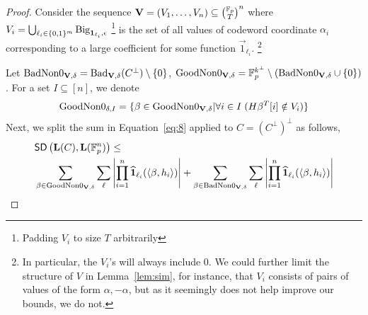 \begin{proof}
Consider the sequence $\vec{V}=(V_1,\ldots,V_n)\subseteq {\binom{\F_p}{T}}^n$ where 
$V_i = \bigcup_{\ell_i\in \{0,1\}^m} \textnormal{Big}_{\mathbf{1}_{\ell_i},\epsilon}$ \footnote{Padding $V_i$ to size $T$ arbitrarily} is the set of all values of codeword coordinate $\alpha_i$ corresponding to a large coefficient for some function $\vec{1}_{\ell_i}$. 
\footnote{In particular, the $V_i$'s will always include 0. We could further limit the structure of $V$ in Lemma~\ref{lem:sim}, for instance, that $V_i$ consists of pairs of values of the form $\alpha,-\alpha$, but as it seemingly does not help improve our bounds, we do not.}

Let $\textnormal{BadNon0}_{\mathbf{V},\delta}=\textnormal{Bad}_{\mathbf{V},\delta}(C^\bot) \setminus \{0\}$, $\textnormal{GoodNon0}_{\mathbf{V},\delta}=\mathbb{F}^{k^\bot}_p\setminus(\textnormal{BadNon0}_{\mathbf{V},\delta}\cup\{0\})$. For a set $I\subseteq [n]$, we denote \[\textnormal{GoodNon0}_{\delta,I}=\{\beta\in \textnormal{GoodNon0}_{\mathbf{V},\delta}| \forall i\in I\;(H\beta^T[i]\notin V_i)\}\]
Next, we split the sum in Equation~\ref{eq:8} applied to $C=(C^\bot)^\bot$ as follows, 
\begin{align}
&\mathsf{SD} \left({\mathbf{L}(C)},{\mathbf{L}(\mathbb{F}^n_p)} \right)\leq\nonumber\\
& \sum_{\beta\in \textnormal{GoodNon0}_{\mathbf{V},\delta}}\sum_{\mathbf{\ell}}\left|\prod^n_{i=1}\widehat{\mathbf{1}}_{\ell_i}(\langle\beta,h_i\rangle)\right| 
  + \sum_{\beta\in \textnormal{BadNon0}_{\mathbf{V},\delta}}\sum_{\mathbf{\ell}}\left|\prod^n_{i=1}\widehat{\mathbf{1}}_{\ell_i}(\langle\beta,h_i\rangle)\right|
\end{align}


\end{proof}
